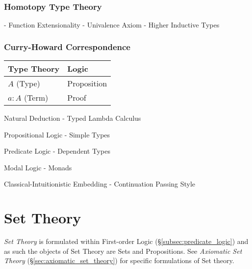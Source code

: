 \documentclass{article}
\begin{document}
\section{Homotopy Type Theory}\label{sec:homotopy_type}

- Function Extensionality
- Univalence Axiom
- Higher Inductive Types



\section{Curry-Howard Correspondence}\label{sec:curry_howard}

\begin{tabular}{| l | l |}
\hline
\textbf{Type Theory} & \textbf{Logic} \\ \hline \hline
$A$ (Type) & Proposition \\ \hline
$a : A$ (Term) & Proof \\
\hline
\end{tabular}

Natural Deduction - Typed Lambda Calculus

Propositional Logic - Simple Types

Predicate Logic - Dependent Types

Modal Logic - Monads

Classical-Intuitionistic Embedding - Continuation Passing Style



\part{Set Theory}\label{sec:set_theory}

\emph{Set Theory} is formulated within First-order Logic
(\S\ref{subsec:predicate_logic}) and as such the objects of Set Theory
are Sets and Propositions. See \emph{Axiomatic Set Theory}
(\S\ref{sec:axiomatic_set_theory}) for specific formulations of Set
theory.
\end{document}
